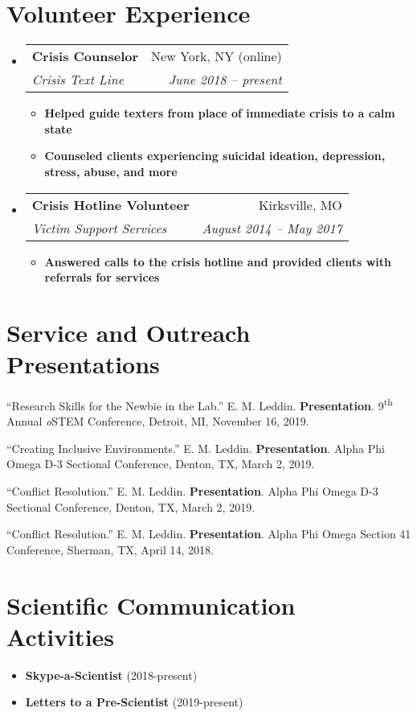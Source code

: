 \documentclass[letterpaper,11pt]{article}
\makeatletter
\newcommand{\resumeItem}[2]{
  \item\small{
    \textbf{#1}{ #2 \vspace{-2pt}}
  }
}
\newcommand{\resumeSubheading}[4]{
  \vspace{-1pt}\item
    \begin{tabular*}{0.97\textwidth}[t]{l@{\extracolsep{\fill}}r}
      \textbf{#1} & #2 \\
      \textit{\small#3} & \textit{\small #4} \\
    \end{tabular*}\vspace{-5pt}
}
\newcommand{\resumeSubItem}[2]{\resumeItem{#1}{#2}\vspace{-4pt}}
\newcommand{\resumeSubHeadingListStart}{\begin{itemize}[leftmargin=*]}
\newcommand{\resumeSubHeadingListEnd}{\end{itemize}}
\newcommand{\resumeItemListStart}{\begin{itemize}}
\newcommand{\resumeItemListEnd}{\end{itemize}\vspace{-5pt}}
\makeatother
\begin{document}
\section{Volunteer Experience}
  \resumeSubHeadingListStart
  
    \resumeSubheading
      {Crisis Counselor}{New York, NY (online)}
      {Crisis Text Line}{June 2018 -- present}
      \resumeItemListStart
        \resumeItem{\textnormal{Helped guide texters from place of immediate crisis to a calm state}}
          {}
        \resumeItem{\textnormal{Counseled clients experiencing suicidal ideation, depression, stress, abuse, and more}}
          {}
      \resumeItemListEnd

    \resumeSubheading
      {Crisis Hotline Volunteer}{Kirksville, MO}
      {Victim Support Services}{August 2014 -- May 2017}
      \resumeItemListStart
        \resumeItem{\textnormal{Answered calls to the crisis hotline and provided clients with referrals for services}}
          {}
      \resumeItemListEnd
  \resumeSubHeadingListEnd

\section{Service and Outreach Presentations}
\begin{etaremune}
\small{
  \item \textnormal{``Research Skills for the Newbie in the Lab.'' E. M. Leddin. \textbf{Presentation}. 9\textsuperscript{th} Annual \emph{o}STEM Conference, Detroit, MI, November 16, 2019.}
  \item \textnormal{``Creating Inclusive Environments.'' E. M. Leddin. \textbf{Presentation}. Alpha Phi Omega D-3 Sectional Conference, Denton, TX, March 2, 2019.}
  \item \textnormal{``Conflict Resolution.'' E. M. Leddin. \textbf{Presentation}. Alpha Phi Omega D-3 Sectional Conference, Denton, TX, March 2, 2019.}
  \item \textnormal{``Conflict Resolution.'' E. M. Leddin. \textbf{Presentation}. Alpha Phi Omega Section 41 Conference, Sherman, TX, April 14, 2018.}
  }
\end{etaremune}

\section{Scientific Communication Activities}
  \resumeSubHeadingListStart
   \resumeSubItem{Skype-a-Scientist}
      {(2018-present)}
    \resumeSubItem{Letters to a Pre-Scientist}
      {(2019-present)}
  \resumeSubHeadingListEnd
\end{document}
